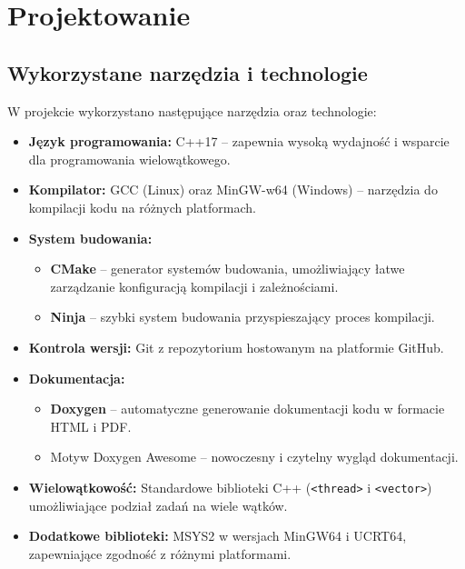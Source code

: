 \newpage
\section{Projektowanie}

\subsection{Wykorzystane narzędzia i technologie}
W projekcie wykorzystano następujące narzędzia oraz technologie:
\begin{itemize}
  \item \textbf{Język programowania:} C++17 – zapewnia wysoką wydajność i wsparcie dla programowania wielowątkowego.
  \item \textbf{Kompilator:} GCC (Linux) oraz MinGW-w64 (Windows) – narzędzia do kompilacji kodu na różnych platformach.
  \item \textbf{System budowania:}
        \begin{itemize}
          \item \textbf{CMake} – generator systemów budowania, umożliwiający łatwe zarządzanie konfiguracją kompilacji i zależnościami.
          \item \textbf{Ninja} – szybki system budowania przyspieszający proces kompilacji.
        \end{itemize}
  \item \textbf{Kontrola wersji:} Git z repozytorium hostowanym na platformie GitHub.
  \item \textbf{Dokumentacja:}
        \begin{itemize}
          \item \textbf{Doxygen} – automatyczne generowanie dokumentacji kodu w formacie HTML i PDF.
          \item Motyw Doxygen Awesome – nowoczesny i czytelny wygląd dokumentacji.
        \end{itemize}
  \item \textbf{Wielowątkowość:} Standardowe biblioteki C++ (\texttt{<thread>} i \texttt{<vector>}) umożliwiające podział zadań na wiele wątków.
  \item \textbf{Dodatkowe biblioteki:} MSYS2 w wersjach MinGW64 i UCRT64, zapewniające zgodność z różnymi platformami.
\end{itemize}

